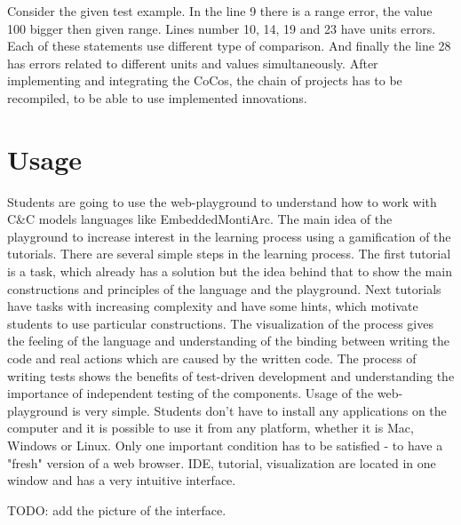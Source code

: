\bigskip
Consider the given test example. In the line 9 there is a range error, the value 100 bigger then given range. Lines number 10, 14, 19 and 23 have units errors. Each of these statements use different type of comparison. And finally the line 28 has errors related to different units and values simultaneously. \newline
After implementing and integrating the CoCos, the chain of projects has to be recompiled, to be able to use implemented innovations.

\chapter{Usage} \label{sec:usage}
Students are going to use the web-playground to understand how to work with C\&C models languages like EmbeddedMontiArc. The main idea of the playground to increase interest in the learning process using a gamification of the tutorials. There are several simple steps in the learning process. The first tutorial is a task, which already has a solution but the idea behind that to show the main constructions and principles of the language and the playground. Next tutorials have tasks with increasing complexity and have some hints, which motivate students to use particular constructions. The visualization of the process gives the feeling of the language and understanding of the binding between writing the code and real actions which are caused by the written code. The process of writing tests shows the benefits of test-driven development and understanding the importance of independent testing of the components.
Usage of the web-playground is very simple. Students don't have to install any applications on the computer and it is possible to use it from any platform, whether it is Mac, Windows or Linux. Only one important condition has to be satisfied - to have a "fresh" version of a web browser. IDE, tutorial, visualization are located in one window and has a very intuitive interface.

TODO: add the picture of the interface.

